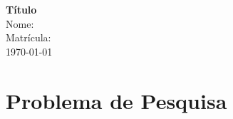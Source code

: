 \documentclass[12pt,a4paper, brazil]{article}
\begin{document}
\begin{center}
{\textbf {\huge Título}}\\[5mm]
{\large Nome: } \\[2mm]
{\large Matrícula: } \\[5mm]
\today\\[5mm] %
\end{center}



\section{Problema de Pesquisa}



\printbibliography
\end{document}
